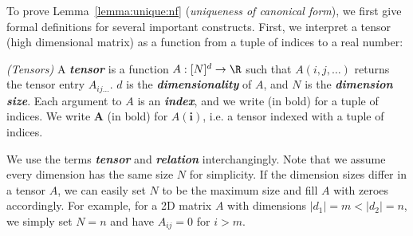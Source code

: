 \documentclass{article}
\begin{document}
To prove Lemma~\ref{lemma:unique:nf} (\textit{uniqueness of canonical form}), we first give formal definitions for several important constructs. First, we interpret a tensor (high dimensional matrix) as a function from a tuple of indices to a real number: 
\begin{definition}{{\em (Tensors)}}
A {\em \textbf{tensor}} is a function $A: [N]^d \rightarrow \R$ such that $A(i,j,\dots)$ returns the tensor entry $A_{ij\dots}$. $d$ is the {\em \textbf{dimensionality}} of $A$, and $N$ is the {\em \textbf{dimension size}}. Each argument to $A$ is an {\em \textbf{index}}, and we write  (in bold) for a tuple of indices. We write $\pmb{A}$ (in bold) for $A(\pmb{i})$, i.e. a tensor indexed with a tuple of indices. 
\end{definition}
We use the terms {\em \textbf{tensor}} and {\em \textbf{relation}} interchangingly. Note that we assume every dimension has the same size $N$ for simplicity. If the dimension sizes differ in a tensor $A$, we can easily set $N$ to be the maximum size and fill $A$ with zeroes accordingly. For example, for a 2D matrix $A$ with dimensions $|d_1| = m < |d_2| =n$, we simply set $N=n$ and have $A_{ij}=0$ for $i>m$. 
\end{document}
